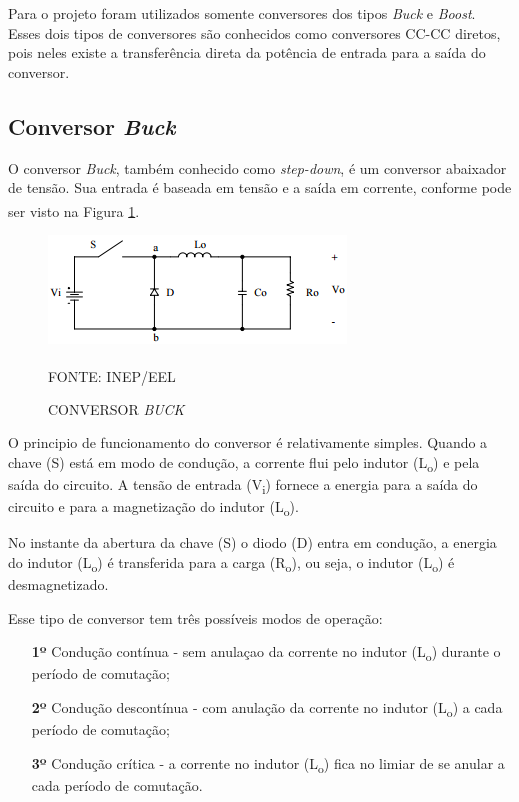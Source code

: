 \documentclass[
	12pt,				%
	openright,			%
	oneside,			%
	a4paper,			%
	english,			%
	french,				%
	spanish,			%
	brazil,				%
	oldfontcommands
	]{abntex2}
\begin{document}
	Para o projeto foram utilizados somente conversores dos tipos \textit{Buck} e \textit{Boost}. Esses dois tipos de conversores são conhecidos como conversores CC-CC diretos, pois neles existe a transferência direta da potência de entrada para a saída do conversor.
	
\subsection[Conversor Buck]{Conversor \textit{Buck}}

	O conversor \textit{Buck}, também conhecido como \textit{step-down}, é um conversor abaixador de tensão. Sua entrada é baseada em tensão e a saída em corrente, conforme pode ser visto na Figura \ref{Fig_buck}.\textsuperscript{\cite{inep}}
	
 	\begin{figure}[th]
		\caption{CONVERSOR \textit{BUCK}}
		\label{Fig_buck}
		\centering
		\includegraphics[width=0.75\linewidth]{./figs/buck}
			
		\begin{small}
			FONTE: INEP/EEL\textsuperscript{\cite{inep}}
		\end{small}		
	\end{figure}

	O principio de funcionamento do conversor é relativamente simples. Quando a chave (S) está em modo de condução, a corrente flui pelo indutor (L\textsubscript{o}) e pela saída do circuito. A tensão de entrada (V\textsubscript{i}) fornece a energia para a saída do circuito e para a magnetização do indutor (L\textsubscript{o}).
	
	No instante da abertura da chave (S) o diodo (D) entra em condução, a energia do indutor (L\textsubscript{o}) é transferida para a carga (R\textsubscript{o}), ou seja, o indutor (L\textsubscript{o}) é desmagnetizado.
	
	Esse tipo de conversor tem três possíveis modos de operação:
	
	\begin{itemize} 
		\item[\textbf{1º}] Condução contínua - sem anulaçao da corrente no indutor (L\textsubscript{o}) durante o período de comutação;
		\item[\textbf{2º}] Condução descontínua - com anulação da corrente no indutor (L\textsubscript{o}) a cada período de comutação;
		\item[\textbf{3º}] Condução crítica - a corrente no indutor (L\textsubscript{o}) fica no limiar de se anular a cada período de comutação.
	\end{itemize}
	
\end{document}
